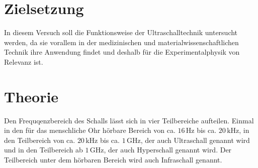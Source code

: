 \section{Zielsetzung}
\label{sec:Zielsetzung}
In diesem Versuch soll die Funktionsweise der Ultraschalltechnik untersucht werden, da sie vorallem in der
medizinischen und materialwissenschaftlichen Technik ihre Anwendung findet und deshalb für die
Experimentalphysik von Relevanz ist.

\section{Theorie}
\label{sec:Theorie}
Den Frequqenzbereich des Schalls lässt sich in vier Teilbereiche aufteilen. Einmal in den für das menschliche
Ohr hörbare Bereich von ca. $16\,\unit{\hertz}$ bis ca. $20\,\unit{\kilo\hertz}$, in den Teilbereich 
von ca. $20\,\unit{\kilo\hertz}$ bis ca. $1\,\unit{\giga\hertz}$, der auch Ultraschall genannt wird und in den
Teilbereich ab $1\,\unit{\giga\hertz}$, der auch Hyperschall genannt wird. Der Teilbereich unter dem
hörbaren Bereich wird auch Infraschall genannt.

